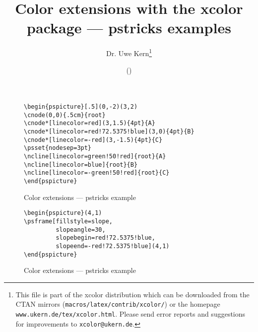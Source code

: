 \documentclass{article}
\begin{document}
\title{Color extensions with the \textsf{xcolor} package --- \textsf{pstricks} examples}
\author{Dr. Uwe Kern\thanks{This file is part of the \textsf{xcolor} distribution which can be downloaded from the CTAN mirrors (\texttt{macros/latex/contrib/xcolor/}) or the homepage \texttt{www.ukern.de/tex/xcolor.html}. Please send error reports and suggestions for improvements to \texttt{xcolor@ukern.de}.}}
\date{\XCfileversion{} (\XCfiledate)}
\maketitle

\centerline{}

\begin{figure}[htb]\caption{Color extensions --- \textsf{pstricks} example\protect\footnotemark[1]}
\bigskip
\begin{minipage}{\textwidth}\small
\begin{verbatim}
\begin{pspicture}[.5](0,-2)(3,2)
\cnode(0,0){.5cm}{root}
\cnode*[linecolor=red](3,1.5){4pt}{A}
\cnode*[linecolor=red!72.5375!blue](3,0){4pt}{B}
\cnode*[linecolor=-red](3,-1.5){4pt}{C}
\psset{nodesep=3pt}
\ncline[linecolor=green!50!red]{root}{A}
\ncline[linecolor=blue]{root}{B}
\ncline[linecolor=-green!50!red]{root}{C}
\end{pspicture}
\end{verbatim}
\end{minipage}\relax
{}
\end{figure}

\begin{figure}[htb]\caption{Color extensions --- \textsf{pstricks} example\protect\footnotemark[2]}
\bigskip
\begin{minipage}{\textwidth}\small
\begin{verbatim}
\begin{pspicture}(4,1)
\psframe[fillstyle=slope,
         slopeangle=30,
         slopebegin=red!72.5375!blue,
         slopeend=-red!72.5375!blue](4,1)
\end{pspicture}
\end{verbatim}
\end{minipage}\relax
{}
\end{figure}
\end{document}
